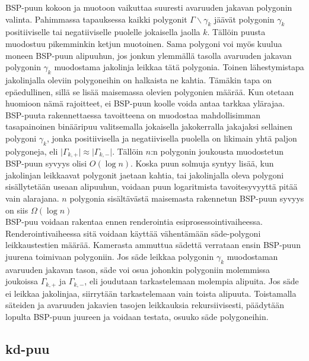 \documentclass[a4paper,12pt, titlepage]{article}
\theoremstyle{break}
\newcommand{\abs}[1]{\vert #1 \vert} %
\begin{document}
BSP-puun kokoon ja muotoon vaikuttaa suuresti avaruuden jakavan polygonin valinta. Pahimmassa tapauksessa kaikki polygonit $\Gamma\backslash\gamma_k$ jäävät polygonin $\gamma_k$ positiiviselle tai negatiiviselle puolelle jokaisella jaolla $k$. Tällöin puusta muodostuu pikemminkin ketjun muotoinen. Sama polygoni voi myös kuulua moneen BSP-puun alipuuhun, jos jonkun ylemmällä tasolla avaruuden jakavan polygonin $\gamma_k$ muodostama jakolinja leikkaa tätä polygonia.\cite{samet} Toinen lähestymistapa jakolinjalla oleviin polygoneihin on halkaista ne kahtia. Tämäkin tapa on epäedullinen, sillä se lisää maisemassa olevien polygonien määrää.\cite{ranta} Kun otetaan huomioon nämä rajoitteet, ei BSP-puun koolle voida antaa tarkkaa ylärajaa.\cite{hughes}\\

BSP-puuta rakennettaessa tavoitteena on muodostaa mahdollisimman tasapainoinen binääripuu valitsemalla jokaisella jakokerralla jakajaksi sellainen polygoni $\gamma_k$, jonka positiivisella ja negatiivisella puolella on likimain yhtä paljon polygoneja, eli $\abs{\Gamma_{k,+}} \approx \abs{\Gamma_{k,-}}$. Tällöin  $n$:n polygonin joukousta muodostetun BSP-puun syvyys olisi $O(\log n)$. Koska puun solmuja syntyy lisää, kun jakolinjan leikkaavat polygonit jaetaan kahtia, tai jakolinjalla oleva polygoni sisällytetään useaan alipuuhun, voidaan puun logaritmista tavoitesyvyyttä pitää vain alarajana.\cite{hughes} $n$ polygonia sisältävästä maisemasta rakennetun BSP-puun syvyys on siis $\Omega(\log n)$\\

BSP-puu voidaan rakentaa ennen renderointia esiprosessointivaiheessa. Renderointivaiheessa sitä voidaan käyttää vähentämään säde-polygoni leikkaustestien määrää. Kamerasta ammuttua sädettä verrataan ensin BSP-puun juurena toimivaan polygoniin. Jos säde leikkaa polygonin $\gamma_k$ muodostaman avaruuden jakavan tason, säde voi osua johonkin polygoniin molemmissa joukoissa ${\Gamma_{k,+}}$ ja ${\Gamma_{k,-}}$, eli joudutaan tarkastelemaan molempia alipuita. Jos säde ei leikkaa jakolinjaa, siirrytään tarkastelemaan vain toista alipuuta. Toistamalla säteiden ja avaruuden jakavien tasojen leikkauksia rekursiivisesti, päädytään lopulta BSP-puun juureen ja voidaan testata, osuuko säde polygoneihin.\cite{ranta}\\

\subsection{kd-puu}
\end{document}
